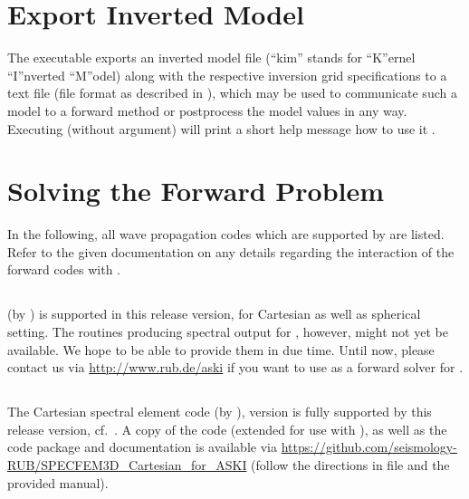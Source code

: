 \section{Export Inverted Model} \label{basic_steps,sec:export_kim}
%
The executable  exports an inverted model file (``kim'' stands for ``K''ernel 
``I''nverted ``M''odel) along with the respective inversion grid specifications to a text file
(file format as described in ), 
which may be used to communicate such a model to a forward method or postprocess the model values in any way. 
Executing  (without argument) will print a short help message how to use it 
.
%
\section{Solving the Forward Problem} \label{basic_steps,sec:forward_problem}
%
In the following, all wave propagation codes which are supported by \ASKI{} are listed.
Refer to the given documentation on any details regarding the interaction of the forward codes with \ASKI{}.
\subsection*{}
 (by \cite{friederich_wd1995}) is supported in this release version, for Cartesian as well as spherical setting. 
The  routines producing spectral output for \ASKI{}, however, might not yet be available. 
We hope to be able to provide them in due time. Until now, please contact us via \url{http://www.rub.de/aski}
if you want to use  as a forward solver for \ASKI{}.
\subsection*{}
The Cartesian spectral element code  (by \cite{TrKoLi08}), 
version  is fully supported by this \ASKI{} release version, cf.~\cite{Specfem3D_Cartesian_for_ASKI}.
A copy of the code (extended for use with \ASKI{}), as well as the code package 
and documentation is available via \url{https://github.com/seismology-RUB/SPECFEM3D_Cartesian_for_ASKI}
(follow the directions in file  and the provided manual).
